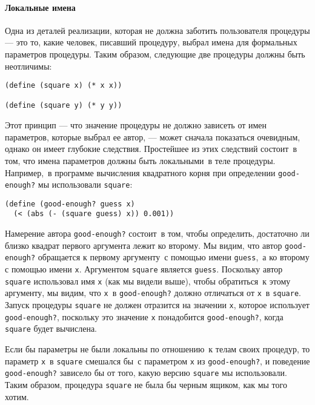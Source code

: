 \paragraph{Локальные имена}


Одна из деталей реализации, которая не должна заботить
пользователя процедуры  --- это то, какие человек, писавший процедуру, 
выбрал имена для формальных параметров процедуры. Таким образом,
следующие две процедуры должны быть неотличимы:

\begin{Verbatim}[fontsize=\small]
(define (square x) (* x x))

(define (square y) (* y y))
\end{Verbatim}
Этот принцип --- что значение процедуры не должно зависеть от имен
параметров, которые выбрал ее автор, --- может сначала показаться
очевидным, однако он имеет глубокие следствия.  Простейшее из этих 
следствий состоит~в том, что имена параметров должны быть локальными~в 
теле процедуры.  Например,~в программе вычисления квадратного корня
при определении {\tt good-enough?} мы использовали
{\tt square}: 

\begin{Verbatim}[fontsize=\small]
(define (good-enough? guess x)
  (< (abs (- (square guess) x)) 0.001))
\end{Verbatim}
Намерение автора {\tt good-enough?} состоит~в том, чтобы
определить, достаточно ли близко квадрат первого аргумента лежит ко
второму.  Мы видим, что автор {\tt good-enough?} обращается к
первому аргументу~с помощью имени {\tt guess},~а ко второму с
помощью имени {\tt x}. Аргументом {\tt square} является
{\tt guess}.   Поскольку автор {\tt square} использовал
имя {\tt x} (как мы видели выше), чтобы обратиться~к этому
аргументу, мы видим, что {\tt x}~в {\tt good-enough?}
должно отличаться от {\tt x}~в {\tt square}. Запуск
процедуры {\tt square} не должен отразится на значении
{\tt x}, которое использует {\tt good-enough?},
поскольку это значение {\tt x} понадобится
{\tt good-enough?}, когда {\tt square} будет
вычислена.

Если бы параметры не были локальны по отношению~к телам
своих процедур, то параметр {\tt x}~в {\tt square}
смешался бы~с параметром {\tt x} из {\tt good-enough?},
и поведение {\tt good-enough?} зависело бы от того, какую
версию {\tt square} мы использовали. Таким образом,
процедура {\tt square} не была бы черным ящиком, как мы того хотим.

